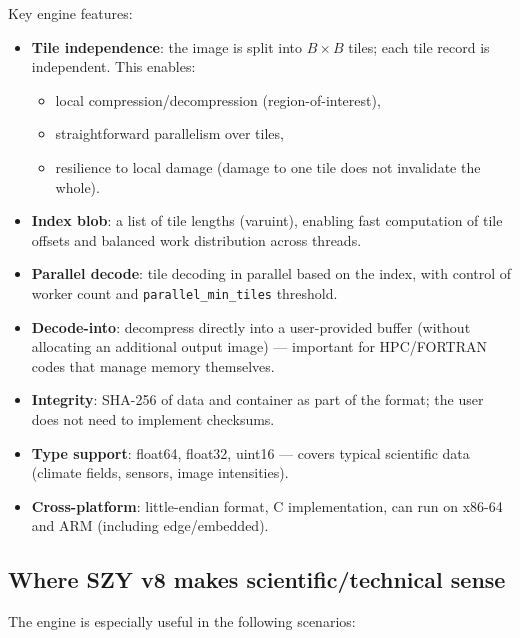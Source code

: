 \documentclass[11pt,a4paper]{article}
\begin{document}
Key engine features:
\begin{itemize}
  \item \textbf{Tile independence}: the image is split into $B\times B$ tiles; each tile record is independent. This enables:
        \begin{itemize}
          \item local compression/decompression (region-of-interest),
          \item straightforward parallelism over tiles,
          \item resilience to local damage (damage to one tile does not invalidate the whole).
        \end{itemize}
  \item \textbf{Index blob}: a list of tile lengths (varuint), enabling fast computation of tile offsets and balanced work distribution across threads.
  \item \textbf{Parallel decode}: tile decoding in parallel based on the index, with control of worker count and \texttt{parallel\_min\_tiles} threshold.
  \item \textbf{Decode-into}: decompress directly into a user-provided buffer (without allocating an additional output image) --- important for HPC/FORTRAN codes that manage memory themselves.
  \item \textbf{Integrity}: SHA-256 of data and container as part of the format; the user does not need to implement checksums.
  \item \textbf{Type support}: float64, float32, uint16 --- covers typical scientific data (climate fields, sensors, image intensities).
  \item \textbf{Cross-platform}: little-endian format, C implementation, can run on x86-64 and ARM (including edge/embedded).
\end{itemize}

\subsection{Where SZY v8 makes scientific/technical sense}
The engine is especially useful in the following scenarios:
\end{document}
